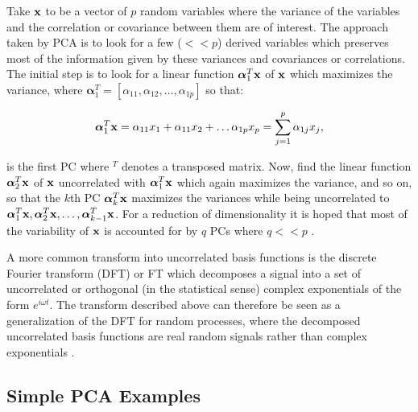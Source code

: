 Take $\textrm{\textbf{x}}$ to be a vector of $p$ random variables where the variance of the variables and the correlation or covariance between them are of interest. The approach taken by PCA is to look for a few ($<<p$) derived variables which preserves most of the information given by these variances and covariances or correlations. The initial step is to look for a linear function $\boldsymbol\alpha_1^T \textrm{\textbf{x}}$ of $\textrm{\textbf{x}}$ which maximizes the variance, where $\boldsymbol\alpha_1^T =  [\alpha_{1{}1},\alpha_{1{}2},\ldots,\alpha_{1{}p}]$ so that:

\begin{equation}\label{eq:PCAdef}
\boldsymbol\alpha_1^T \textrm{\textbf{x}}= \alpha_{1{}1}x_1 +\alpha_{1{}1} x_2 + \ldots \alpha_{1{}p} x_p = \sum^p_{j=1}\alpha_{1{}j}x_j,
\end{equation}

is the first PC where ${}^T$ denotes a transposed matrix.
Now, find the linear function $\boldsymbol\alpha_2^T \textrm{\textbf{x}}$ of $\textrm{\textbf{x}}$ uncorrelated with $\boldsymbol\alpha_1^T \textrm{\textbf{x}}$ which again maximizes the variance, and so on, so that the $k$th PC $\boldsymbol\alpha_k^T \textrm{\textbf{x}}$ maximizes the variances while being uncorrelated to $\boldsymbol\alpha_1^T \textrm{\textbf{x}}, \boldsymbol\alpha_2^T \textrm{\textbf{x}}, \ldots, \boldsymbol\alpha_{k-1}^T \textrm{\textbf{x}}$. For a reduction of dimensionality it is hoped that most of the variability of $\textrm{\textbf{x}}$ is accounted for by $q$ PCs where $q<<p$ \citep[chap. 1]{Jolliffe1986}.

A more common transform into uncorrelated basis functions is the discrete Fourier transform (DFT) or FT which decomposes a signal into a set of uncorrelated or orthogonal (in the statistical sense) complex exponentials of the form $e^{i\omega t}$. The transform described above can therefore be seen as a generalization of the DFT for random processes, where the decomposed uncorrelated basis functions are real random signals rather than complex exponentials \citep[chap. 4.6]{Therrien1992}.

\subsection{Simple PCA Examples}

